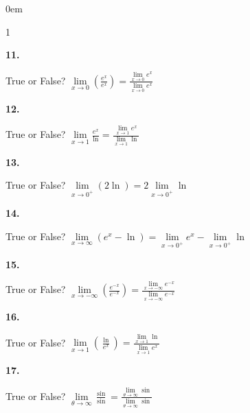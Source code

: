 \documentclass[12pt,]{book}
\theoremstyle{plain}
\theoremstyle{definition}
\numberwithin{equation}{section}
\newenvironment{exercisegroup}%
{\medskip\noindent}%
{\par\bigskip}%
\newlength{\exercisegroupindent}%
\newlength{\exercisegroupitemwidth}%
\newenvironment{exercisegrouplist}%
{\vspace{-\partopsep}%
\begin{adjustwidth}{\exercisegroupindent}{0em}}%
{\end{adjustwidth}%
\vspace{-\partopsep}%
\vspace{\baselineskip}}%
\newenvironment{exercisegroupbycol}[1]%
{\begin{exercisegrouplist}%
\vspace{-\multicolsep}%
\begin{multicols}{#1}%
\setlength{\parindent}{0em}%
\setlength{\exercisegroupitemwidth}{\linewidth}}%
{\end{multicols}%
\vspace{-\multicolsep}%
\end{exercisegrouplist}}%
\newenvironment{exercisegroupitem}[1]%
{\begin{minipage}[t]{\exercisegroupitemwidth}
\vspace{0pt}%
{\bfseries#1}%
\rule{0pt}{\baselineskip}}{\strut%
\end{minipage}%
\hspace{\columnsep}}%
\providecommand\phantomsection{}
\newcommand{\fe}[2]{\mathop{{#1}{\left(#2\right)}}}
\begin{document}
\begin{exerciselist}
\begin{exercisegroup}
\par
\begin{exercisegroupbycol}{1}%
\begin{exercisegroupitem}{11. }\phantomsection\hypertarget{exercise-hear-me-first}{\null}
True or False? \(\lim\limits_{x\to0}\left(\frac{e^x}{e^x}\right)=\frac{\lim\limits_{x\to0}e^x}{\lim\limits_{x\to0}e^x}\)%
\end{exercisegroupitem}%
\par%
\begin{exercisegroupitem}{12. }\phantomsection\hypertarget{exercise-101}{\null}
True or False? \(\lim\limits_{x\to1}\frac{e^x}{\fe{\ln}{x}}=\frac{\lim\limits_{x\to1}e^x}{\lim\limits_{x\to1}\fe{\ln}{x}}\)%
\end{exercisegroupitem}%
\par%
\begin{exercisegroupitem}{13. }\phantomsection\hypertarget{exercise-102}{\null}
True or False? \(\lim\limits_{x\to0^{+}}\left(2\fe{\ln}{x}\right)=2\lim\limits_{x\to0^{+}}\fe{\ln}{x}\)%
\end{exercisegroupitem}%
\par%
\begin{exercisegroupitem}{14. }\phantomsection\hypertarget{exercise-103}{\null}
True or False? \(\lim\limits_{x\to\infty}\left(e^x-\fe{\ln}{x}\right)=\lim\limits_{x\to0^{+}}e^x-\lim\limits_{x\to0^{+}}\fe{\ln}{x}\)%
\end{exercisegroupitem}%
\par%
\begin{exercisegroupitem}{15. }\phantomsection\hypertarget{exercise-104}{\null}
True or False? \(\lim\limits_{x\to-\infty}\left(\frac{e^{-x}}{e^{-x}}\right)=\frac{\lim\limits_{x\to-\infty}e^{-x}}{\lim\limits_{x\to-\infty}e^{-x}}\)%
\end{exercisegroupitem}%
\par%
\begin{exercisegroupitem}{16. }\phantomsection\hypertarget{exercise-105}{\null}
True or False? \(\lim\limits_{x\to1}\left(\frac{\fe{\ln}{x}}{e^x}\right)=\frac{\lim\limits_{x\to1}\fe{\ln}{x}}{\lim\limits_{x\to1}e^x}\)%
\end{exercisegroupitem}%
\par%
\begin{exercisegroupitem}{17. }\phantomsection\hypertarget{exercise-106}{\null}
True or False? \(\lim\limits_{\theta\to\infty}\frac{\fe{\sin}{\theta}}{\fe{\sin}{\theta}}=\frac{\lim\limits_{\theta\to\infty}\fe{\sin}{\theta}}{\lim\limits_{\theta\to\infty}\fe{\sin}{\theta}}\)%

\end{exercisegroupitem}
\end{exercisegroupbycol}
\end{exercisegroup}
\end{exerciselist}
\end{document}
